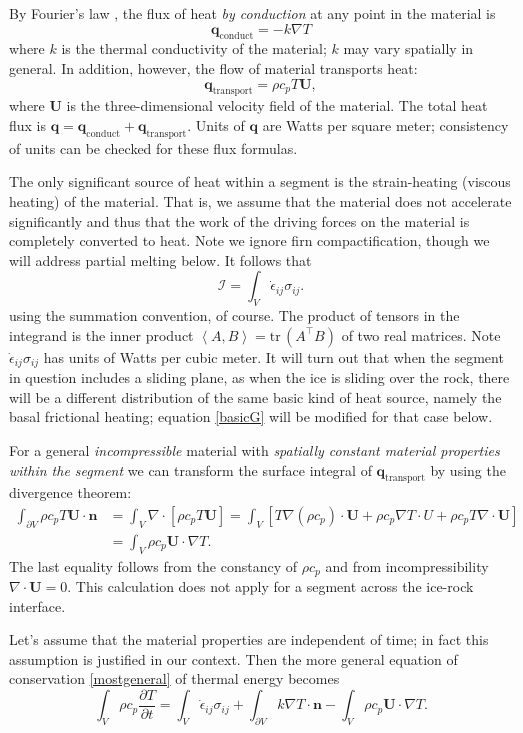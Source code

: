 \documentclass[12pt,final]{amsart}%
\theoremstyle{plain}
\theoremstyle{definition}
\theoremstyle{remark}
\newcommand{\ddt}[1]{\ensuremath{\frac{\partial #1}{\partial t}}}
\newcommand{\diverg}{\nabla\cdot}
\newcommand{\Div}{\diverg}
\def\eps{\epsilon}
\newcommand{\grad}{\nabla}
\newcommand{\ip}[2]{\ensuremath{\left<#1,#2\right>}}
\newcommand{\nhat}{\mathbf{n}}
\def\tr{\mathrm{tr}\,}
\newcommand{\bq}{{\mathbf{q}}}
\newcommand{\bU}{{\mathbf{U}}}
\begin{document}
By Fourier's law \citep{Fowler}, the flux of heat \emph{by conduction} at any point in the material is
    $$\bq_{\text{conduct}} = - k \grad T$$
where $k$ is the thermal conductivity of the material; $k$ may vary spatially in general.  In addition, however, the flow of material transports heat:
    $$\bq_{\text{transport}} = \rho c_p T \bU,$$
where $\bU$ is the three-dimensional velocity field of the material.  The total heat flux is $\bq = \bq_{\text{conduct}} + \bq_{\text{transport}}$.  Units of $\bq$ are Watts per square meter; consistency of units can be checked for these flux formulas.

The only significant source of heat within a segment is the strain-heating (viscous heating) of the material.  That is, we assume that the material does not accelerate significantly and thus that the work of the driving forces on the material is completely converted to heat.  Note we ignore firn compactification, though we will address partial melting below.  It follows that \citep[see][]{Paterson}
\begin{equation}\label{basicG}
\mathcal{I} = \int_V \dot\eps_{ij} \sigma_{ij}.
\end{equation}
using the summation convention, of course.  The product of tensors in the integrand is the inner product $\ip{A}{B}=\tr(A^\top B)$ of two real matrices.  Note $\dot\eps_{ij} \sigma_{ij}$ has units of Watts per cubic meter.  It will turn out that when the segment in question includes a sliding plane, as when the ice is sliding over the rock, there will be a different distribution of the same basic kind of heat source, namely the basal frictional heating; equation \eqref{basicG} will be modified for that case below.

For a general \emph{incompressible} material with \emph{spatially constant material properties within the segment} we can transform the surface integral of $\bq_{\text{transport}}$ by using the divergence theorem:
\begin{align*}
\int_{\partial V} \rho c_p T \bU \cdot \nhat &= \int_V \Div\left[\rho c_p T \bU\right] = \int_V \left[T \grad(\rho c_p) \cdot \bU + \rho c_p \grad T \cdot U + \rho c_p T \Div \bU\right] \\
    &= \int_V \rho c_p \bU \cdot \grad T.
\end{align*}
The last equality follows from the constancy of $\rho c_p$ and from incompressibility $\Div \bU = 0$.  This calculation does not apply for a segment across the ice-rock interface.

Let's assume that the material properties are independent of time; in fact this assumption is justified in our context.  Then the more general equation of conservation \eqref{mostgeneral} of thermal energy becomes
\begin{equation}\label{general}
\int_V \rho c_p \ddt{T} = \int_V \dot \eps_{ij} \sigma_{ij} + \int_{\partial V} k \grad T \cdot \nhat - \int_V \rho c_p \bU \cdot \grad T.
\end{equation}
\end{document}
